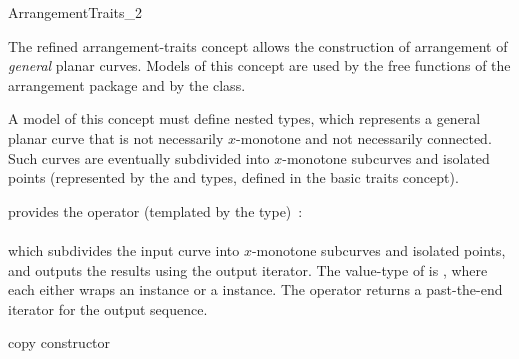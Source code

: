 \begin{ccRefConcept}{ArrangementTraits_2}

\ccDefinition

The refined arrangement-traits concept allows the construction of arrangement
of {\sl general} planar curves. Models of this concept are used
by the free  functions of the arrangement package and
by the  class.

A model of this concept must define nested  types, which
represents a general planar curve that is not necessarily $x$-monotone
and not necessarily connected. Such curves are eventually subdivided into
$x$-monotone subcurves and isolated points (represented by the 
and  types, defined in the basic traits concept).

\ccRefines
{}

\ccTypes



{provides the operator (templated by the  type)~: \\
  \\
 which subdivides the input curve  into $x$-monotone subcurves and
 isolated points, and outputs the results using the output iterator.
 The value-type of  is , where each
  either wraps an  instance or a
  instance. The operator returns a past-the-end iterator
 for the output sequence.}

\ccCreation
{}

\ccGlue
{}
{copy constructor}
\ccGlue
{}




\end{ccRefConcept}
